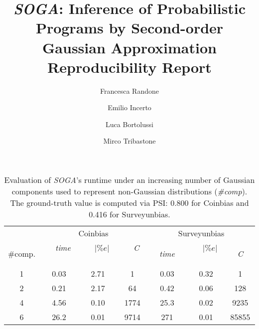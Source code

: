 \documentclass[a4paper]{llncs}
\newcommand{\soga}{\textsl{SOGA}}
\begin{document}
\mainmatter

\title{\soga: Inference of Probabilistic Programs by Second-order Gaussian Approximation Reproducibility Report}


\author{Francesca Randone  \and Emilio Incerto  \and Luca Bortolussi  \and Mirco Tribastone}

\allowdisplaybreaks[0]

\maketitle
\setcounter{table}{3}
\begin{table}[t]
\caption{Evaluation of \soga's runtime under an increasing number of Gaussian components used to represent non-Gaussian distributions (\emph{\#comp}). The ground-truth value is computed via PSI: 0.800 for Coinbias and 0.416 for Surveyunbias.}
\centering
\begin{tabular}{ccccccc}
\toprule
 & \multicolumn{3}{c}{Coinbias} & \multicolumn{3}{c}{Surveyunbias} \\
 \cmidrule(l){2-4}  \cmidrule(l){5-7}
\#comp. & \ \ \emph{time} \ \ & \ \ $|\%e|$ \ \ &\ \  \emph{C} \ \ & \ \ \emph{time}\ \  &\ \  $|\%e|$ \ \ &\ \  \emph{C}\ \   \\
\midrule
1& 0.03 & 2.71 & 1&  0.03 & 0.32     &1\\
2& 0.21 & 2.17 & 64 & 0.42 & 0.06   &128\\
4& 4.56 & 0.10 & 1774 & 25.3 & 0.02  &9235\\
6& 26.2 & 0.01 & 9714 & 271 & 0.01 &85855\\
\bottomrule
\end{tabular}
\label{tab:sendCmp}
\end{table}
\end{document}
